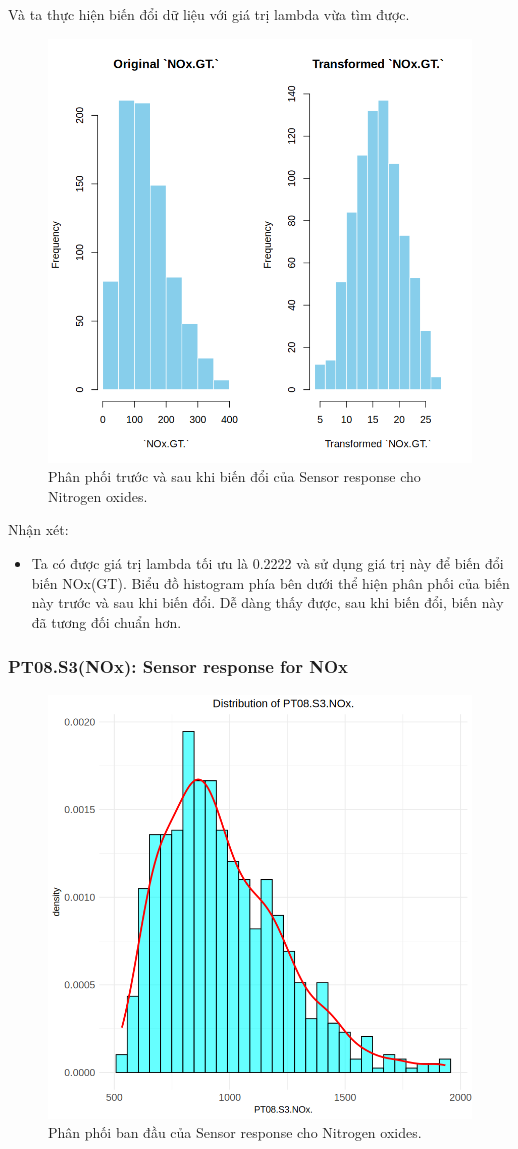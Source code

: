 Và ta thực hiện biến đổi dữ liệu với giá trị lambda vừa tìm được.
\begin{figure}[H]
    \centering
    \includegraphics[width=0.75\columnwidth]{air_figures/NOx(GT)_transformed_distribution.png}
    \caption{Phân phối trước và sau khi biến đổi của Sensor response cho Nitrogen oxides.}
    \label{fig:nox_transformed_distribution}
\end{figure}
Nhận xét:
\begin{itemize}
    \item Ta có được giá trị lambda tối ưu là 0.2222 và sử dụng giá trị này để biến đổi biến NOx(GT). Biểu đồ histogram phía bên dưới thể hiện phân phối của biến này trước và sau khi biến đổi. Dễ dàng thấy được, sau khi biến đổi, biến này đã tương đối chuẩn hơn.
\end{itemize}

\subsubsection{PT08.S3(NOx): Sensor response for NOx}

\begin{figure}[H]
    \centering
    \includegraphics[width=0.75\columnwidth]{air_figures/PT08.S3(NOx)_original_distribution.png}
    \caption{Phân phối ban đầu của Sensor response cho Nitrogen oxides.}
    \label{fig:ptnox_original_distribution}
\end{figure}

